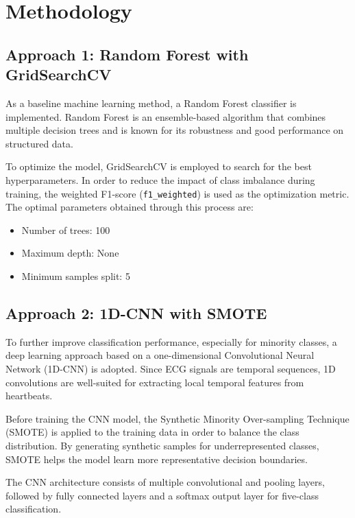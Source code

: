 \documentclass{IEEEtran}
\begin{document}
\section{Methodology}

\subsection{Approach 1: Random Forest with GridSearchCV}

As a baseline machine learning method, a Random Forest classifier is
implemented. Random Forest is an ensemble-based algorithm that combines
multiple decision trees and is known for its robustness and good performance
on structured data.

To optimize the model, GridSearchCV is employed to search for the best
hyperparameters. In order to reduce the impact of class imbalance during
training, the weighted F1-score (\texttt{f1\_weighted}) is used as the
optimization metric. The optimal parameters obtained through this process
are:
\begin{itemize}
    \item Number of trees: 100
    \item Maximum depth: None
    \item Minimum samples split: 5
\end{itemize}

\subsection{Approach 2: 1D-CNN with SMOTE}

To further improve classification performance, especially for minority
classes, a deep learning approach based on a one-dimensional Convolutional
Neural Network (1D-CNN) is adopted. Since ECG signals are temporal sequences,
1D convolutions are well-suited for extracting local temporal features from
heartbeats.

Before training the CNN model, the Synthetic Minority Over-sampling
Technique (SMOTE) is applied to the training data in order to balance the
class distribution. By generating synthetic samples for underrepresented
classes, SMOTE helps the model learn more representative decision boundaries.

The CNN architecture consists of multiple convolutional and pooling layers,
followed by fully connected layers and a softmax output layer for
five-class classification.
\end{document}
